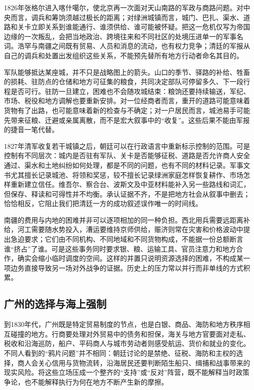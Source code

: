 1826年张格尔进入喀什噶尔，使北京再一次面对天山南路的军政与商路问题。对中央而言，调兵和筹饷须越过极长的距离；对绿洲城镇而言，城门、巴扎、渠水、道路和关卡立即关系到谁能通行、谁须供给、谁可能被怀疑。把这一危机仅写为帝国边缘的一次叛乱，会把当地政治、跨境往来和不同社区的处境压进单一的军事名词。浩罕与南疆之间既有贸易、人员和消息的流动，也有权力竞争；清廷的军报从自己的调兵和处置出发组织这些关系，不能预先替所有地方行动者命名其目的。

军队能够抵达某座城，并不只是战略图上的箭头。山口的季节、驿路的补给、牲畜的损耗、驻防点的仓储和地方可征集的粮食，共同决定部队可停留多久、下一段行程是否可行。驻防一旦建立，困难也不会随攻城结束：粮饷还要持续输送，军纪、市场、税役和地方调解也要重新安排。对一位经商者而言，重开的道路可能意味着货物有了出路，也可能意味着新的检查与不确定；对一户居民而言，城池易手可能先带来征粮、迁避或亲属离散，而不是宏大叙事中的“收复”。这些后果不能由军报的捷音一笔代替。

1827年清军收复若干城镇之后，朝廷可以在行政语言中重新标示控制的范围。可是控制有不同层次：城内是否驻有军队、关卡是否能够征税、道路是否允许商人安全通过、渠水和土地纠纷如何处理，都是不同的问题，也有不同的材料记录。军事文书尤其擅长记录城池、将领和奖惩，较不擅长记录绿洲家庭怎样恢复耕作、市场怎样重新建立信任。维吾尔、察合台、波斯文及中亚材料能补入另一些路线和词汇，但保存、释读和可得性并不均衡。承认证据不齐，不是把地方社会从叙事中删去；恰恰相反，它阻止我们把清廷一方的成功叙述误作唯一的时间线。

南疆的费用与内地的困难并非可以逐项相加的同一种负担。西北用兵需要远距离补给，河工需要随水势投入，漕运要维持京师供给，赈济则常在灾害和价格波动中提出急迫要求；它们由不同机构、不同地域和不同货物构成，不能据一份总额断言谁“挤占”了谁。可是这些事务同时要求银、粮、运输工具、官员注意力和地方合作，确实会缩小临时调度的空间。这样的并置只说明资源选择的困难，不构成某一项边务直接导致另一场对外战争的证据。历史上的压力常以并行而非单线的方式积累。

\subsection{广州的选择与海上强制}

到1830年代，广州既是特定贸易制度的节点，也是白银、商品、海防和地方秩序相互碰撞的地方。行商要处理对外贸易中的债务和担保，海关与地方官要面对走私、税收和沿海巡防，船户、平码商人与城市劳动者则感受航运、货价和就业的变化。不同人看到的“鸦片问题”并不相同：朝廷讨论的是禁绝、征税、海防和主权的选择，商人会关心信用与货物流转，沿海居民还要判断陌生船只、缉捕和战事带来的现实风险。将这些立场压成一个整齐的“支持”或“反对”阵营，既不能解释当时政策争论，也不能解释执行为何在地方不断产生新的摩擦。

